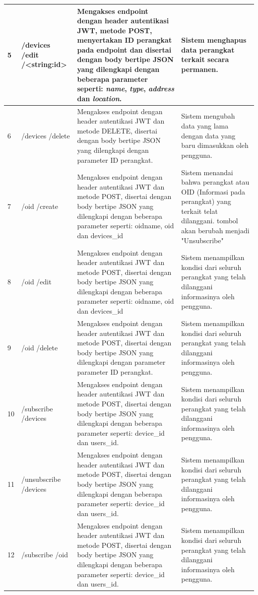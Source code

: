 \begin{longtable}{|p{}|p{}|p{}|p{}|}
            	5 & /devices /edit /<string:id> & Mengakses endpoint dengan header autentikasi JWT, metode POST, menyertakan ID perangkat pada endpoint dan disertai dengan body bertipe JSON yang dilengkapi dengan beberapa parameter seperti: \textit{name}, \textit{type}, \textit{address} dan \textit{location}. & Sistem menghapus data perangkat terkait secara permanen. \\ \hline
            	6 & /devices /delete & Mengakses endpoint dengan header autentikasi JWT dan metode DELETE, disertai dengan body bertipe JSON yang dilengkapi dengan parameter ID perangkat. & Sistem mengubah data yang lama dengan data yang baru dimasukkan oleh pengguna. \\ \hline
            	7 & /oid /create & Mengakses endpoint dengan header autentikasi JWT dan metode POST, disertai dengan body bertipe JSON yang dilengkapi dengan beberapa parameter seperti: oidname, oid dan devices\_id & Sistem menandai bahwa perangkat atau OID (Informasi pada perangkat) yang terkait telat dilanggani. tombol akan berubah menjadi "Unsubscribe"\\ \hline
            	8 & /oid /edit & Mengakses endpoint dengan header autentikasi JWT dan metode POST, disertai dengan body bertipe JSON yang dilengkapi dengan beberapa parameter seperti: oidname, oid dan devices\_id & Sistem menampilkan kondisi dari seluruh perangkat yang telah dilanggani informasinya oleh pengguna. \\ \hline
            	9 & /oid /delete & Mengakses endpoint dengan header autentikasi JWT dan metode POST, disertai dengan body bertipe JSON yang dilengkapi dengan parameter parameter ID perangkat. & Sistem menampilkan kondisi dari seluruh perangkat yang telah dilanggani informasinya oleh pengguna. \\ \hline
            	10 & /subscribe /devices & Mengakses endpoint dengan header autentikasi JWT dan metode POST, disertai dengan body bertipe JSON yang dilengkapi dengan beberapa parameter seperti: device\_id dan users\_id. & Sistem menampilkan kondisi dari seluruh perangkat yang telah dilanggani informasinya oleh pengguna. \\ \hline
            	11 & /unsubscribe /devices & Mengakses endpoint dengan header autentikasi JWT dan metode POST, disertai dengan body bertipe JSON yang dilengkapi dengan beberapa parameter seperti: device\_id dan users\_id. & Sistem menampilkan kondisi dari seluruh perangkat yang telah dilanggani informasinya oleh pengguna. \\ \hline
            	12 & /subscribe /oid & Mengakses endpoint dengan header autentikasi JWT dan metode POST, disertai dengan body bertipe JSON yang dilengkapi dengan beberapa parameter seperti: device\_id dan users\_id. & Sistem menampilkan kondisi dari seluruh perangkat yang telah dilanggani informasinya oleh pengguna. \\ \hline

\end{longtable}
